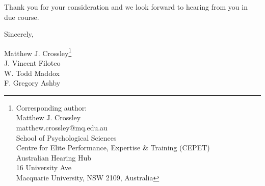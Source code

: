 \documentclass[10pt]{article}
\begin{document}
Thank you for your consideration and we look forward to
hearing from you in due course.

Sincerely,

Matthew J. Crossley\footnote{
  Corresponding author:\\
  Matthew J. Crossley\\
  matthew.crossley@mq.edu.au\\
  School of Psychological Sciences\\
  Centre for Elite Performance, Expertise \& Training (CEPET)\\
  Australian Hearing Hub\\
  16 University Ave\\
  Macquarie University, NSW 2109, Australia
}\\
J. Vincent Filoteo\\
W. Todd Maddox\\
F. Gregory Ashby
\end{document}
